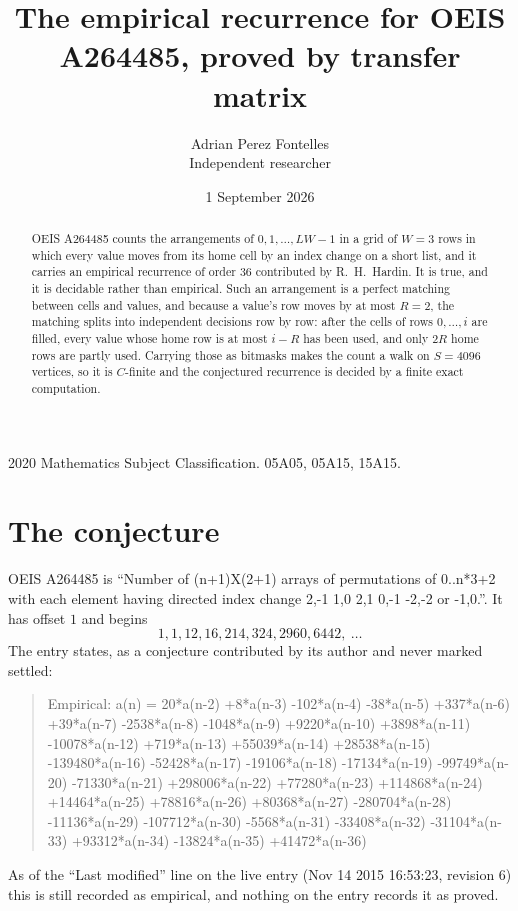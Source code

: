 \documentclass[11pt,a4paper]{article}
\title{The empirical recurrence for OEIS A264485, proved by transfer matrix}
\author{Adrian Perez Fontelles\\ \small Independent researcher}
\date{1 September 2026}
\theoremstyle{plain}
\theoremstyle{definition}
\begin{document}
\maketitle

\begin{abstract}
OEIS A264485 counts the arrangements of $0,1,\dots,LW-1$ in a grid of $W=3$ rows in which
every value moves from its home cell by an index change on a short list, and it carries an
empirical recurrence of order $36$ contributed by R.~H.~Hardin. It is true, and it is
decidable rather than empirical. Such an arrangement is a perfect matching between cells and
values, and because a value's row moves by at most $R=2$, the matching splits into
independent decisions row by row: after the cells of rows $0,\dots,i$ are filled,
every value whose home row is at most $i-R$ has been used, and only $2R$ home rows are
partly used. Carrying those as bitmasks makes the count a walk on $S=4096$ vertices, so it is
$C$-finite and the conjectured recurrence is decided by a finite exact computation.
\end{abstract}

\noindent\small 2020 Mathematics Subject Classification. 05A05, 05A15, 15A15.\normalsize

\section{The conjecture}

OEIS A264485 is ``Number of (n+1)X(2+1) arrays of permutations of 0..n*3+2 with each element having directed index change 2,-1 1,0 2,1 0,-1 -2,-2 or -1,0.''. It has offset $1$ and begins
\[
1, 1, 12, 16, 214, 324, 2960, 6442,\ \dots
\]
The entry states, as a conjecture contributed by its author and never marked settled:
\begin{quote}
Empirical: a(n) = 20*a(n-2) +8*a(n-3) -102*a(n-4) -38*a(n-5) +337*a(n-6) +39*a(n-7) -2538*a(n-8) -1048*a(n-9) +9220*a(n-10) +3898*a(n-11) -10078*a(n-12) +719*a(n-13) +55039*a(n-14) +28538*a(n-15) -139480*a(n-16) -52428*a(n-17) -19106*a(n-18) -17134*a(n-19) -99749*a(n-20) -71330*a(n-21) +298006*a(n-22) +77280*a(n-23) +114868*a(n-24) +14464*a(n-25) +78816*a(n-26) +80368*a(n-27) -280704*a(n-28) -11136*a(n-29) -107712*a(n-30) -5568*a(n-31) -33408*a(n-32) -31104*a(n-33) +93312*a(n-34) -13824*a(n-35) +41472*a(n-36)
\end{quote}
As of the ``Last modified'' line on the live entry (Nov 14 2015 16:53:23, revision 6) this is still
recorded as empirical, and nothing on the entry records it as proved.
\end{document}
